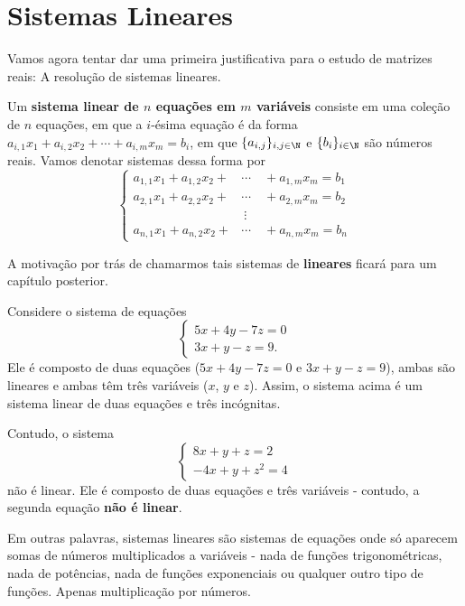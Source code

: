 \section{Sistemas Lineares}

Vamos agora tentar dar uma primeira justificativa para o estudo de matrizes reais: A resolução de sistemas lineares.

\begin{df}
	Um \textbf{sistema linear de $n$ equações em $m$ variáveis} consiste em uma coleção de $n$ equações, em que a $i$-ésima equação é da forma $a_{i,1}x_1+a_{i,2}x_2+\cdots+a_{i,m}x_m=b_i$, em que $\{a_{i,j}\}_{i,j\in \N}$ e $\{b_i\}_{i\in \N}$ são números reais. Vamos denotar sistemas dessa forma por
	\[
	\begin{cases}
	a_{1,1}x_1+a_{1,2}x_2+&\cdots\quad+a_{1,m}x_m=b_1\\
	a_{2,1}x_1+a_{2,2}x_2+&\cdots\quad+a_{2,m}x_m=b_2\\
	&\ \vdots\\
	a_{n,1}x_1+a_{n,2}x_2+&\cdots\quad+a_{n,m}x_m=b_n
	\end{cases}
	\]
\end{df}

\begin{rmk}
	A motivação por trás de chamarmos tais sistemas de \textbf{lineares} ficará para um capítulo posterior.
\end{rmk}

\begin{ex}
	Considere o sistema de equações
	\[\begin{cases}
	5x+4y-7z=0\\
	3x+y-z=9.
	\end{cases}\] Ele é composto de duas equações ($5x+4y-7z=0$ e $3x+y-z=9$), ambas são lineares e ambas têm três variáveis ($x$, $y$ e $z$). Assim, o sistema acima é um sistema linear de duas equações e três incógnitas.
	
	\tcblower
	
	Contudo, o sistema
	\[
	\begin{cases}
	8x+y+z=2\\
	-4x+y+z^2=4
	\end{cases}
	\]não é linear. Ele é composto de duas equações e três variáveis - contudo, a segunda equação \textbf{não é linear}.
\end{ex}

Em outras palavras, sistemas lineares são sistemas de equações onde só aparecem somas de números multiplicados a variáveis - nada de funções trigonométricas, nada de potências, nada de funções exponenciais ou qualquer outro tipo de funções. Apenas multiplicação por números.

